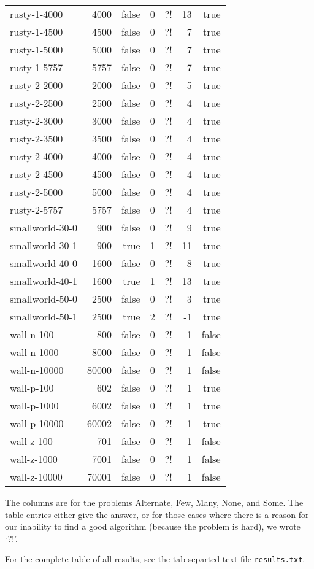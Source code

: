 \documentclass{tufte-handout}
\begin{document}
\begin{longtable}{lrrrrrr}
rusty-1-4000&4000&false&0&?!&13&true\\ 
rusty-1-4500&4500&false&0&?!&7&true\\ 
rusty-1-5000&5000&false&0&?!&7&true\\ 
rusty-1-5757&5757&false&0&?!&7&true\\ 
rusty-2-2000&2000&false&0&?!&5&true\\ 
rusty-2-2500&2500&false&0&?!&4&true\\ 
rusty-2-3000&3000&false&0&?!&4&true\\ 
rusty-2-3500&3500&false&0&?!&4&true\\ 
rusty-2-4000&4000&false&0&?!&4&true\\ 
rusty-2-4500&4500&false&0&?!&4&true\\ 
rusty-2-5000&5000&false&0&?!&4&true\\ 
rusty-2-5757&5757&false&0&?!&4&true\\ 
smallworld-30-0&900&false&0&?!&9&true\\ 
smallworld-30-1&900&true&1&?!&11&true\\ 
smallworld-40-0&1600&false&0&?!&8&true\\ 
smallworld-40-1&1600&true&1&?!&13&true\\ 
smallworld-50-0&2500&false&0&?!&3&true\\ 
smallworld-50-1&2500&true&2&?!&-1&true\\ 
wall-n-100&800&false&0&?!&1&false\\ 
wall-n-1000&8000&false&0&?!&1&false\\ 
wall-n-10000&80000&false&0&?!&1&false\\ 
wall-p-100&602&false&0&?!&1&true\\ 
wall-p-1000&6002&false&0&?!&1&true\\ 
wall-p-10000&60002&false&0&?!&1&true\\ 
wall-z-100&701&false&0&?!&1&false\\ 
wall-z-1000&7001&false&0&?!&1&false\\ 
wall-z-10000&70001&false&0&?!&1&false\\ 

  \bottomrule
\end{longtable}
\medskip

The columns are for the problems Alternate, Few, Many, None, and Some.
The table entries either give the answer, or for those cases where there is a reason for our inability to find a good algorithm (because the problem is hard), we wrote `?!'.

For the complete table of all results, see the tab-separted text file {\tt results.txt}.
\end{document}
